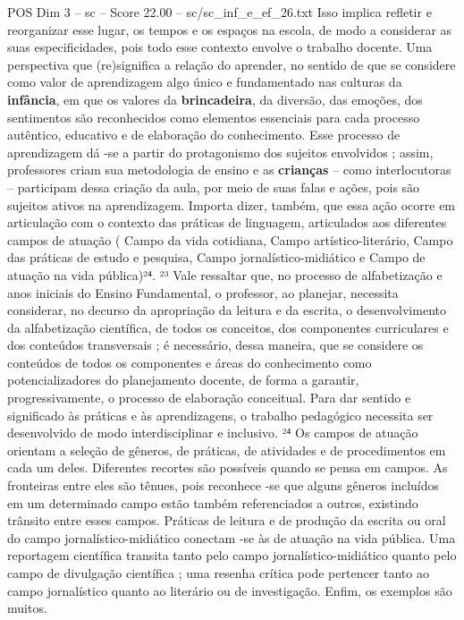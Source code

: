 \begin{textsample}{POS Dim 3 – sc – Score 22.00 – sc/sc\_inf\_e\_ef\_26.txt}
Isso implica refletir e reorganizar esse lugar, os tempos e os espaços na escola, de modo a considerar as suas especificidades, pois todo esse contexto envolve o trabalho docente.
Uma perspectiva que (re)significa a relação do aprender, no sentido de que se considere como valor de aprendizagem algo único e fundamentado nas culturas da \textbf{infância}, em que os valores da \textbf{brincadeira}, da diversão, das emoções, dos sentimentos são reconhecidos como elementos essenciais para cada processo autêntico, educativo e de elaboração do conhecimento.
Esse processo de aprendizagem dá -se a partir do protagonismo dos sujeitos envolvidos ; assim, professores criam sua metodologia de ensino e as \textbf{crianças} – como interlocutoras – participam dessa criação da aula, por meio de suas falas e ações, pois são sujeitos ativos na aprendizagem.
Importa dizer, também, que essa ação ocorre em articulação com o contexto das práticas de linguagem, articulados aos diferentes campos de atuação ( Campo da vida cotidiana, Campo artístico-literário, Campo das práticas de estudo e pesquisa, Campo jornalístico-midiático e Campo de atuação na vida pública)²⁴. ²³ Vale ressaltar que, no processo de alfabetização e anos iniciais do Ensino Fundamental, o professor, ao planejar, necessita considerar, no decurso da apropriação da leitura e da escrita, o desenvolvimento da alfabetização científica, de todos os conceitos, dos componentes curriculares e dos conteúdos transversais ; é necessário, dessa maneira, que se considere os conteúdos de todos os componentes e áreas do conhecimento como potencializadores do planejamento docente, de forma a garantir, progressivamente, o processo de elaboração conceitual.
Para dar sentido e significado às práticas e às aprendizagens, o trabalho pedagógico necessita ser desenvolvido de modo interdisciplinar e inclusivo. ²⁴ Os campos de atuação orientam a seleção de gêneros, de práticas, de atividades e de procedimentos em cada um deles.
Diferentes recortes são possíveis quando se pensa em campos.
As fronteiras entre eles são tênues, pois reconhece -se que alguns gêneros incluídos em um determinado campo estão também referenciados a outros, existindo trânsito entre esses campos.
Práticas de leitura e de produção da escrita ou oral do campo jornalístico-midiático conectam -se às de atuação na vida pública.
Uma reportagem científica transita tanto pelo campo jornalístico-midiático quanto pelo campo de divulgação científica ; uma resenha crítica pode pertencer tanto ao campo jornalístico quanto ao literário ou de investigação.
Enfim, os exemplos são muitos.

\end{textsample}
